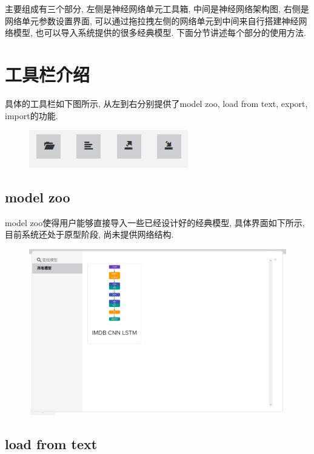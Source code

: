 \documentclass{progbookcn}
\begin{document}
主要组成有三个部分, 左侧是神经网络单元工具箱, 中间是神经网络架构图, 右侧是网络单元参数设置界面, 可以通过拖拉拽左侧的网络单元到中间来自行搭建神经网络模型, 也可以导入系统提供的很多经典模型. 下面分节讲述每个部分的使用方法.



\section{工具栏介绍}

具体的工具栏如下图所示, 从左到右分别提供了model zoo, load from text, export, import的功能.

\begin{figure}[H]
  \centering
  \includegraphics{toolbar.png}
\end{figure}


\subsection{model zoo}

model zoo使得用户能够直接导入一些已经设计好的经典模型, 具体界面如下所示, 目前系统还处于原型阶段, 尚未提供网络结构.
\begin{figure}[H]
  \centering
  \includegraphics[width=0.98\linewidth]{model_zoo.png}
\end{figure}


\subsection{load from text}
\end{document}
